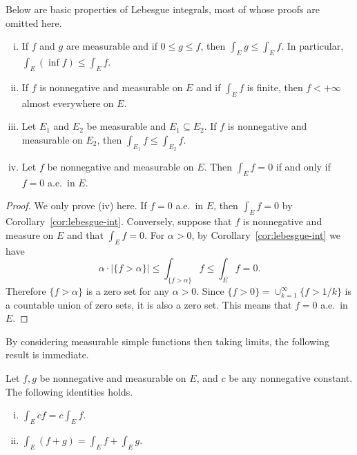\documentclass[11pt]{article}
\begin{document}
Below are basic properties of Lebesgue integrals, most of whose proofs are omitted here.

\begin{prop}
  \label{prop:lebesgue-property}
  \begin{enumerate}[(i)]
    \item If $f$ and $g$ are measurable and if $0 \leqslant g \leqslant f$, then $\int_E g \leqslant \int_E f$.  In particular, $\int_E (\inf f) \leqslant \int_E f$.

    \item If $f$ is nonnegative and measurable on $E$ and if $\int_E f$ is finite, then $f < +\infty$ almost everywhere on $E$.

    \item Let $E_1$ and $E_2$ be measurable and $E_1 \subseteq E_2$.  If $f$ is nonnegative and measurable on $E_2$, then $\int_{E_1} f \leqslant \int_{E_2} f$.

    \item Let $f$ be nonnegative and measurable on $E$.  Then $\int_E f = 0$ if and only if $f = 0$ a.e.\ in $E$.
  \end{enumerate}
\end{prop}

\begin{proof}
  We only prove (iv) here.  If $f = 0$ a.e.\ in $E$, then $\int_E f = 0$ by Corollary~\ref{cor:lebesgue-int}.  Conversely, suppose that $f$ is nonnegative and measure on $E$ and that $\int_E f = 0$.  For $\alpha > 0$, by Corollary~\ref{cor:lebesgue-int} we have
  \[
    \alpha \cdot |\{ f > \alpha \}| \leqslant \int_{\{f > \alpha\}} f \leqslant \int_E f = 0.
  \]
  Therefore $\{ f > \alpha \}$ is a zero set for any $\alpha > 0$.  Since $\{ f > 0 \} = \cup_{k=1}^\infty \{ f > 1/k \}$ is a countable union of zero sets, it is also a zero set.  This means that $f = 0$ a.e.\ in $E$.
\end{proof}

By considering measurable simple functions then taking limits, the following result is immediate.

\begin{prop}
  \label{prop:lebesgue-linear}
  Let $f, g$ be nonnegative and measurable on $E$, and $c$ be any nonnegative constant.  The following identities holds.
  \begin{enumerate}[(i)]
    \item $\int_E cf = c \int_E f$.

    \item $\int_E (f+g) = \int_E f + \int_E g$.
  \end{enumerate}
\end{prop}
\end{document}
